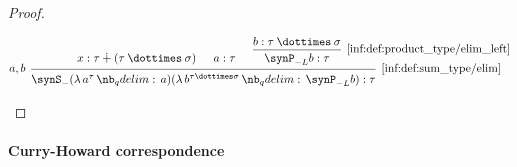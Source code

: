 \begin{proof}
\begin{paracol}{2}
    \begin{rightcolumn}
      \ParacolAlignmentHack
      \begin{equation*}
        \begin{prooftree}
          \hypo{ x: \tau \synplus (\tau \syntimes \sigma) }

          \hypo{ a: \tau }

          \hypo{ b: \tau \syntimes \sigma }
          \infer1[\ref{inf:def:product_type/elim_left}]{ \synP_{-L} b: \tau }

          \infer[left label={\( a, b \)}]3[\ref{inf:def:sum_type/elim}]{ \synS_- (\qabs {a^\tau} a) (\qabs {b^{\tau \syntimes \sigma}} \synP_{-L} b): \tau }
        \end{prooftree}
      \end{equation*}
    \end{rightcolumn}
  \end{paracol}
  \columnratio{}
\end{proof}

\paragraph{Curry-Howard correspondence}\hfill

